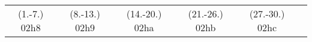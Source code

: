 \begin{exercises}{}
{%
\par \practiceinfo
\par \begin{tabular}[h]{cccccc}
(1.-7.)	02h8	&
(8.-13.)	02h9	&
(14.-20.)	02ha	&
(21.-26.)	02hb	&
(27.-30.)	02hc	&
\\ %
\end{tabular}
}
\end{exercises}



